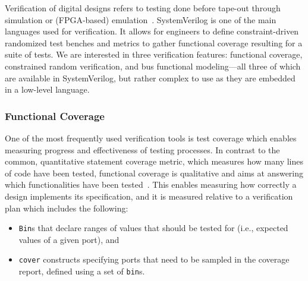 \documentclass[conference]{IEEEtran}
\begin{document}
Verification of digital designs refers to testing done before tape-out through simulation 
or (FPGA-based) emulation~\cite{spear2008systemverilog}. SystemVerilog is one 
of the main languages used for verification. It allows for engineers to define constraint-driven 
randomized test benches and metrics to gather functional coverage resulting for a suite of 
tests. We are interested in three verification features: functional coverage, 
constrained random verification, and bus functional modeling---all three of which are available in 
SystemVerilog, but rather complex to use as they are embedded in a low-level language.

\subsubsection{Functional Coverage}

One of the most frequently used verification tools is test coverage which enables measuring 
progress and effectiveness of testing processes. In contrast to the common, quantitative statement 
coverage metric, which measures how many lines of code have been tested, functional coverage is 
qualitative and aims at answering which functionalities have been 
tested~\cite{spear2008systemverilog}. This enables measuring how correctly a design implements its 
specification, and it is measured relative to a verification plan which includes the following:

\begin{itemize}
  \item \texttt{Bin}s that declare ranges of values that should be tested for (i.e., expected values of a given port), and 
  \item \texttt{cover} constructs specifying ports that need to be sampled in the coverage report, defined using a set of \texttt{bin}s.
\end{itemize}
\end{document}
